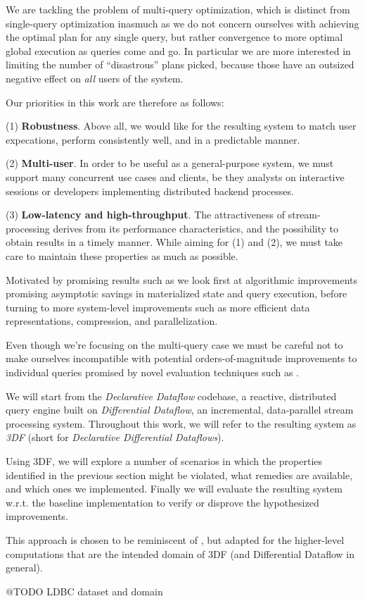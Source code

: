\documentclass[../index.tex]{subfiles}
\begin{document}
We are tackling the problem of multi-query optimization, which is
distinct from single-query optimization inasmuch as we do not concern
ourselves with achieving the optimal plan for any single query, but
rather convergence to more optimal global execution as queries come
and go. In particular we are more interested in limiting the number of
``disastrous'' plans picked, because those have an outsized negative
effect on \emph{all} users of the system.

Our priorities in this work are therefore as follows:

(1) \textbf{Robustness}. Above all, we would like for the resulting system
to match user expecations, perform consistently well, and in a
predictable manner.

(2) \textbf{Multi-user}. In order to be useful as a general-purpose system,
we must support many concurrent use cases and clients, be they
analysts on interactive sessions or developers implementing
distributed backend processes.

(3) \textbf{Low-latency and high-throughput}. The attractiveness of
stream-processing derives from its performance characteristics, and
the possibility to obtain results in a timely manner. While aiming for
(1) and (2), we must take care to maintain these properties as much as
possible.

Motivated by promising results such as \cite{aref2015design} we look
first at algorithmic improvements promising asymptotic savings in
materialized state and query execution, before turning to more
system-level improvements such as more efficient data representations,
compression, and parallelization.

Even though we're focusing on the multi-query case we must be careful
not to make ourselves incompatible with potential orders-of-magnitude
improvements to individual queries promised by novel evaluation
techniques such as \cite{tekle2011more}.

We will start from the \emph{Declarative Dataflow} codebase, a
reactive, distributed query engine built on \emph{Differential
  Dataflow}, an incremental, data-parallel stream processing
system. Throughout this work, we will refer to the resulting system as
\emph{3DF} (short for \emph{Declarative Differential Dataflows}).

Using 3DF, we will explore a number of scenarios in which the
properties identified in the previous section might be violated, what
remedies are available, and which ones we implemented. Finally we will
evaluate the resulting system w.r.t. the baseline implementation to
verify or disprove the hypothesized improvements.

This approach is chosen to be reminiscent of \cite{hirzel2014catalog},
but adapted for the higher-level computations that are the intended
domain of 3DF (and Differential Dataflow in general).

@TODO LDBC dataset and domain
\end{document}
